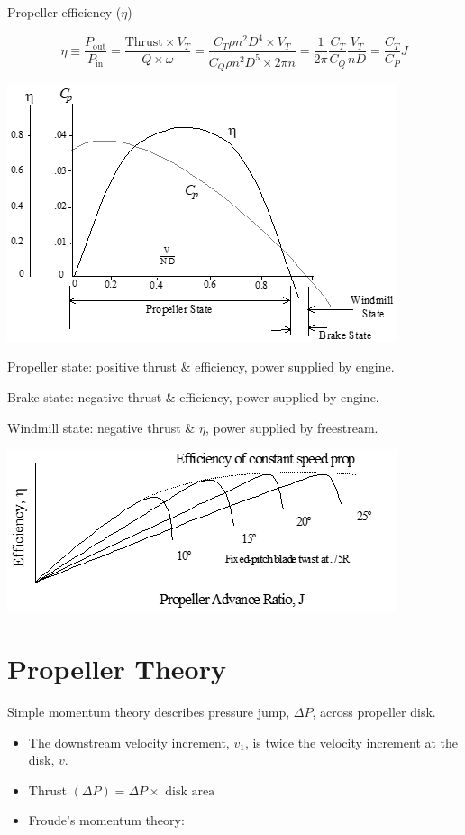 \documentclass[
]{book}
\providecommand{\tightlist}{%
  \setlength{\itemsep}{0pt}\setlength{\parskip}{0pt}}
\begin{document}
Propeller efficiency (\(\eta\))

\[
\eta \equiv \frac{P_{\text{out}}}{P_{\text{in}}} = \frac{\text{Thrust} \times V_T}{Q \times \omega} = \frac{C_T \rho n^2 D^4 \times V_T}{C_Q \rho n^2 D^5 \times 2 \pi n} = \frac{1}{2 \pi} \frac{C_T}{C_Q} \frac{V_T}{nD} = \frac{C_T}{C_P} J
\]

\includegraphics[width=4.49931in,height=2.97847in]{media/11/image15.png}

Propeller state: positive thrust \& efficiency, power supplied by engine.

Brake state: negative thrust \& efficiency, power supplied by engine.

Windmill state: negative thrust \& \(\eta\), power supplied by freestream.

\includegraphics[width=4.49931in,height=1.875in]{media/11/image16.png}

\hypertarget{propeller-theory}{%
\section{Propeller Theory}\label{propeller-theory}}

Simple momentum theory describes pressure jump, \(\Delta P\), across propeller disk.

\begin{itemize}
\tightlist
\item
  The downstream velocity increment, \(v_1\), is twice the velocity increment at the disk, \(v\).
\item
  Thrust \(\left( \Delta P \right) = \Delta P \times \text{ disk area}\)
\item
  Froude's momentum theory:
\end{itemize}
\end{document}
